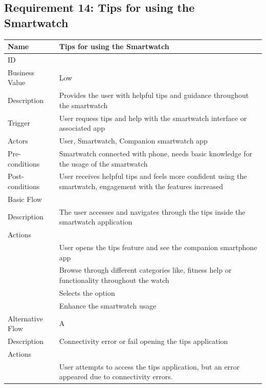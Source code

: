 \documentclass{article}
\begin{document}
	\subsection{Requirement 14: Tips for using the Smartwatch}
		\begin{center}
			\begin{tabularx}{1.0\textwidth}{|>{\raggedright\arraybackslash}p{}|>{\raggedright\arraybackslash}X|}
				\hline
				Name             & Tips for using the Smartwatch \\ \hline
				ID               & 14 \\ \hline
				Business Value   & Low \\ \hline
				Description      & Provides the user with helpful tips and guidance throughout the smartwatch \\ \hline
				Trigger          & User requess tips and help with the smartwatch interface or associated app \\ \hline
				Actors           & User, Smartwatch, Companion smartwatch app \\ \hline
				Pre-conditions   & Smartwatch connected with phone, needs basic knowledge for the usage of the smartwatch \\ \hline
				Post-conditions  & User receives helpful tips and feels more confident using the smartwatch, engagement with the features increased \\ \hline
				Basic Flow       & \\ \hline
								Description & The user accesses and navigates through the tips inside the smartwatch application \\ \hline
								Actions & \\ \hline
								1 & User opens the tips feature and see the companion smartphone app \\ \hline
								2 & Browse through different categories like, fitness help or functionality throughout the watch \\ \hline
								3 & Selects the option \\ \hline
								4 & Enhance the smartwatch usage \\ \hline
				Alternative Flow & A \\ \hline
								Description & Connectivity error or fail opening the tips application \\ \hline
								Actions & \\ \hline
								1 & User attempts to access the tips application, but an error appeared due to connectivity errors. \\ \hline

\end{tabularx}
\end{center}
\end{document}
